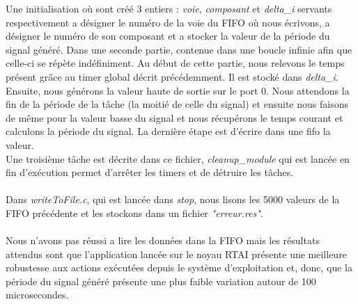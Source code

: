 Une initialisation où sont créé 3 entiers : \emph{voie}, \emph{composant} et \emph{delta\_i} servants respectivement a désigner le numéro de la voie du FIFO où nous écrivons, a désigner le numéro de son composant et a stocker la valeur de la période du signal généré.
Dans une seconde partie, contenue dans une boucle infinie afin que celle-ci se répète indéfiniment. Au début de cette partie, nous relevons le temps présent grâce au timer global décrit précédemment. Il est  stocké dans \emph{delta\_i}. Ensuite, nous générons la valeur haute de sortie sur le port 0. Nous attendons la fin de la période de la tâche (la moitié de celle du signal) et ensuite nous faisons de même pour la valeur basse du signal et nous récupérons le temps courant et calculons la période du signal. La dernière étape est d'écrire dans une fifo la valeur.\\
Une troisième tâche est décrite dans ce fichier, \emph{cleanup\_module} qui est lancée en fin d'exécution permet d'arrêter les timers et de détruire les tâches. \\
\\

Dans \emph{writeToFile.c}, qui est lancée dans \emph{stop}, nous lisons les 5000 valeurs de la FIFO précédente et les stockons dans un fichier \emph{"erreur.res"}.\\
\\

Nous n'avons pas réussi a lire les données dans la FIFO mais les résultats attendus sont que l'application lancée sur le noyau RTAI présente une meilleure robustesse aux actions exécutées depuis le système d'exploitation et, donc, que la période du signal généré présente une plus faible variation autour de 100 microsecondes.